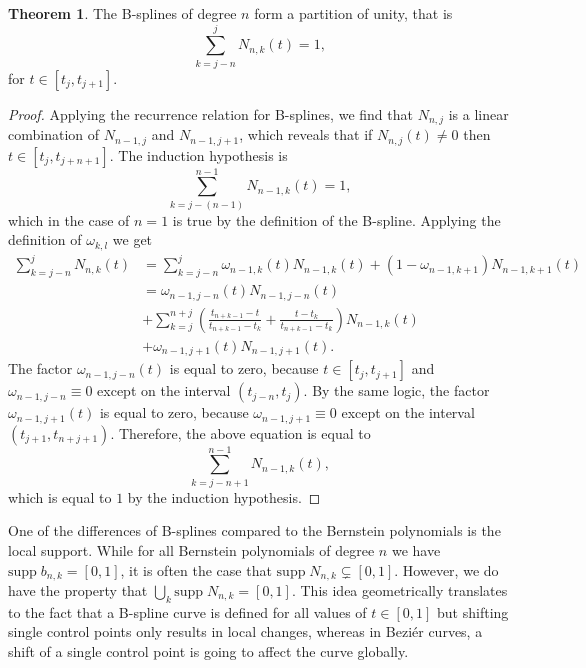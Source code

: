 \documentclass[a4paper, 11pt]{report}
\theoremstyle{definition}
\newtheorem{theorem}[definition]{Theorem}
\begin{document}
\begin{theorem}
	The B-splines of degree $n$ form a partition of unity, that is
	\begin{equation}
		\sum_{k=j-n}^j N_{n,k}(t) = 1,
	\end{equation}
	for $t \in [t_j, t_{j+1}]$.
\end{theorem}
\begin{proof}
	Applying the recurrence relation for B-splines, we find that $N_{n,j}$ is a linear combination of $N_{n-1, j}$ and $N_{n-1, j+1}$, which reveals that if $N_{n, j}(t) \neq 0$ then $t \in [t_j, t_{j+n+1}]$. The induction hypothesis is
	\begin{equation}
		\sum_{k=j-(n-1)}^{n-1} N_{n-1,k}(t) = 1,
	\end{equation}
	which in the case of $n=1$ is true by the definition of the B-spline. Applying the definition of $\omega_{k,l}$ we get
	\begin{align*}
		\sum_{k=j-n}^j N_{n,k}(t)	&= \sum_{k=j-n}^j \omega_{n-1, k}(t) N_{n-1, k}(t) + (1-\omega_{n-1, k+1}) N_{n-1, k+1}(t) \\
									&= \omega_{n-1, j-n}(t) N_{n-1, j-n}(t)\\
									&+ \sum_{k=j}^{n+j} \left(\frac{t_{n+k-1} - t}{t_{n+k-1} - t_{k}} + \frac{t - t_k}{t_{n+k-1} - t_k}\right) N_{n-1,k}(t)\\
									&+ \omega_{n-1, j+1}(t) N_{n-1, j+1}(t).
	\end{align*}
	The factor $\omega_{n-1, j-n}(t)$ is equal to zero, because $t \in [t_j, t_{j+1}]$ and $\omega_{n-1, j-n} \equiv 0$ except on the interval $(t_{j-n}, t_j)$.
	By the same logic, the factor $\omega_{n-1, j+1}(t)$ is equal to zero, because $\omega_{n-1, j+1} \equiv 0$ except on the interval $(t_{j+1}, t_{n+j+1})$. Therefore, the above equation is equal to
	\begin{equation}
		\sum_{k=j-n+1}^{n-1} N_{n-1,k}(t),
	\end{equation}
	which is equal to $1$ by the induction hypothesis.
\end{proof}

One of the differences of B-splines compared to the Bernstein polynomials is the local support. While for all Bernstein polynomials of degree $n$ we have $\text{supp}\;b_{n,k} = [0, 1]$, it is often the case that $\text{supp}\;N_{n,k} \subsetneq [0, 1]$. However, we do have the property that $\bigcup_k \text{supp} \; N_{n,k} = [0,1]$. This idea geometrically translates to the fact that a B-spline curve is defined for all values of $t \in [0,1]$ but shifting single control points only results in local changes, whereas in Beziér curves, a shift of a single control point is going to affect the curve globally.
\end{document}
